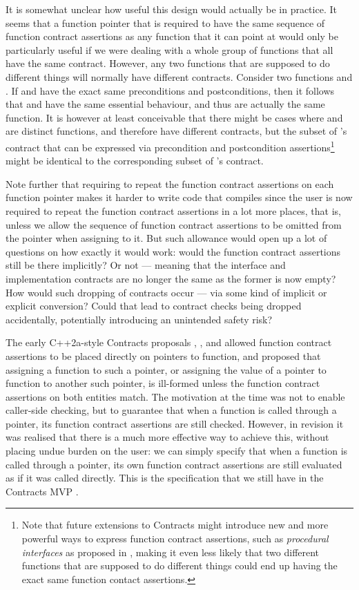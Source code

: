 It is somewhat unclear how useful this design would actually be in practice. It seems that a function pointer that is required to have the same sequence of function contract assertions as any function that it can point at would only be particularly useful if we were dealing with a whole group of functions that all have the same contract. However, any two functions that are supposed to do different things will normally have different contracts. Consider two functions  and . If  and  have the exact same preconditions and postconditions, then it follows that  and  have the same essential behaviour, and thus are actually the same function. It is however at least conceivable that there might be cases where  and  are distinct functions, and therefore have different contracts, but the subset of 's contract that can be expressed via precondition and postcondition assertions\footnote{Note that future extensions to Contracts might introduce new and more powerful ways to express function contract assertions, such as \emph{procedural interfaces} as proposed in \cite{P0465R0}, making it even less likely that two different functions that are supposed to do different things could end up having the exact same function contact assertions.} might be identical to the corresponding subset of 's contract.

Note further that requiring to repeat the function contract assertions on each function pointer makes it harder to write code that compiles since the user is now required to repeat the function contract assertions in a lot more places, that is, unless we allow the sequence of function contract assertions to be omitted from the pointer when assigning to it. But such allowance would open up a lot of questions on how exactly it would work: would the function contract assertions still be there implicitly? Or not --- meaning that the interface and implementation contracts are no longer the same as the former is now empty? How would such dropping of contracts occur --- via some kind of implicit or explicit conversion? Could that lead to contract checks being dropped accidentally, potentially introducing an unintended safety risk?

The early C++2a-style Contracts proposals \cite{N4415}, \cite{P0287R0}, and \cite{P0380R0} allowed function contract assertions to be placed directly on pointers to function, and proposed that assigning a function to such a pointer, or assigning the value of a pointer to function to another such pointer, is ill-formed unless the function contract assertions on both entities match. The motivation at the time was not to enable caller-side checking, but to guarantee that when a function is called through a pointer, its function contract assertions are still checked. However, in  revision \cite{P0380R1} it was realised that there is a much more effective way to achieve this, without placing undue burden on the user: we can simply specify that when a function is called through a pointer, its own function contract assertions are still evaluated as if it was called directly. This is the specification that we still have in the Contracts MVP \cite{P2900R7}.

